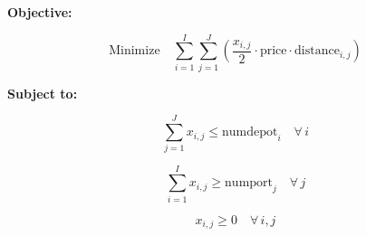 \documentclass{article}
\begin{document}
\textbf{Objective:}

\[
\text{Minimize} \quad \sum_{i=1}^{I} \sum_{j=1}^{J} \left( \frac{x_{i,j}}{2} \cdot \text{price} \cdot \text{distance}_{i,j} \right)
\]

\textbf{Subject to:}

\[
\sum_{j=1}^{J} x_{i,j} \leq \text{numdepot}_i \quad \forall \, i
\]

\[
\sum_{i=1}^{I} x_{i,j} \geq \text{numport}_j \quad \forall \, j
\]

\[
x_{i,j} \geq 0 \quad \forall \, i, j
\]
\end{document}
